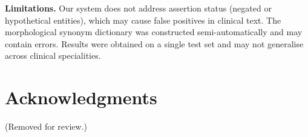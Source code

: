 \documentclass[11pt]{article}
\begin{document}
\textbf{Limitations.} Our system does not address assertion status (negated or hypothetical
entities), which may cause false positives in clinical text. The morphological synonym
dictionary was constructed semi-automatically and may contain errors. Results were
obtained on a single test set and may not generalise across clinical specialities.

\section*{Acknowledgments}
(Removed for review.)


\end{document}
